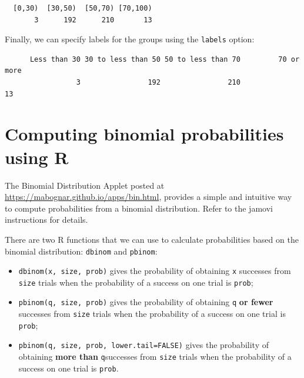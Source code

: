 \documentclass[
  a4paper,
]{memoir}
\newenvironment{Shaded}{\begin{snugshade}}{\end{snugshade}}
\newcommand{\AttributeTok}[1]{\textcolor[rgb]{0.00,0.00,0.00}{#1}}
\newcommand{\ConstantTok}[1]{\textcolor[rgb]{0.00,0.00,0.00}{#1}}
\newcommand{\DecValTok}[1]{\textcolor[rgb]{0.00,0.00,0.00}{#1}}
\newcommand{\FunctionTok}[1]{\textcolor[rgb]{0.00,0.00,0.00}{#1}}
\newcommand{\NormalTok}[1]{\textcolor[rgb]{0.00,0.00,0.00}{#1}}
\newcommand{\OtherTok}[1]{\textcolor[rgb]{0.00,0.00,0.00}{#1}}
\newcommand{\SpecialCharTok}[1]{\textcolor[rgb]{0.00,0.00,0.00}{#1}}
\newcommand{\StringTok}[1]{\textcolor[rgb]{0.00,0.00,0.00}{#1}}
\providecommand{\tightlist}{%
  \setlength{\itemsep}{0pt}\setlength{\parskip}{0pt}}
\begin{document}
\begin{verbatim}
  [0,30)  [30,50)  [50,70) [70,100) 
       3      192      210       13 
\end{verbatim}

Finally, we can specify labels for the groups using the \texttt{labels}
option:

\begin{Shaded}
\end{Shaded}

\begin{verbatim}
      Less than 30 30 to less than 50 50 to less than 70         70 or more 
                 3                192                210                 13 
\end{verbatim}

\section{Computing binomial probabilities using R}\label{sec-binom-r}

The Binomial Distribution Applet posted at
\url{https://mabognar.github.io/apps/bin.html}, provides a simple and
intuitive way to compute probabilities from a binomial distribution.
Refer to the jamovi instructions for details.

There are two R functions that we can use to calculate probabilities
based on the binomial distribution: \texttt{dbinom} and \texttt{pbinom}:

\begin{itemize}
\tightlist
\item
  \texttt{dbinom(x,\ size,\ prob)} gives the probability of obtaining
  \texttt{x} successes from \texttt{size} trials when the probability of
  a success on one trial is \texttt{prob};
\item
  \texttt{pbinom(q,\ size,\ prob)} gives the probability of obtaining
  \texttt{q} \textbf{or fewer} successes from \texttt{size} trials when
  the probability of a success on one trial is \texttt{prob};
\item
  \texttt{pbinom(q,\ size,\ prob,\ lower.tail=FALSE)} gives the
  probability of obtaining \textbf{more than} \texttt{q}successes from
  \texttt{size} trials when the probability of a success on one trial is
  \texttt{prob}.
\end{itemize}
\end{document}
